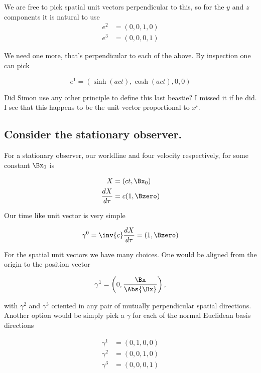 We are free to pick spatial unit vectors perpendicular to this, so for the $y$ and $z$ components it is natural to use
\begin{align*}
e^2 &= ( 0, 0, 1, 0 ) \\
e^3 &= ( 0, 0, 0, 1 )
\end{align*}

We need one more, that's perpendicular to each of the above.  By inspection one can pick

\begin{equation*}
e^1 = ( \sinh( a c t ), \cosh( a c t), 0, 0) 
\end{equation*}

Did Simon use any other principle to define this last beastie?  I missed it if he did.  I see that this happens to be the unit vector proportional to $x^i$.

\subsection{Consider the stationary observer.}

For a stationary observer, our worldline and four velocity respectively, for some constant $\Bx_0$ is

\begin{align}\label{eqn:relativisticElectrodynamicsT2:600}
X &= ( ct, \Bx_0 ) \\
\frac{dX}{d\tau} &= c ( 1, \Bzero) 
\end{align}

Our time like unit vector is very simple

\begin{equation}\label{eqn:relativisticElectrodynamicsT2:610}
\gamma^0 = \inv{c} \frac{dX}{d\tau} = ( 1, \Bzero ) 
\end{equation}

For the spatial unit vectors we have many choices.  One would be aligned from the origin to the position vector

\begin{equation}\label{eqn:relativisticElectrodynamicsT2:620}
\gamma^1 = \left( 0, \frac{\Bx}{\Abs{\Bx}} \right),
\end{equation}

with $\gamma^2$ and $\gamma^3$ oriented in any pair of mutually perpendicular spatial directions.  Another option would be simply pick a $\gamma$ for each of the normal Euclidean basis directions

\begin{align}\label{eqn:relativisticElectrodynamicsT2:630}
\gamma^1 &= ( 0, 1, 0, 0 ) \\
\gamma^2 &= ( 0, 0, 1, 0 ) \\
\gamma^3 &= ( 0, 0, 0, 1 )
\end{align}

